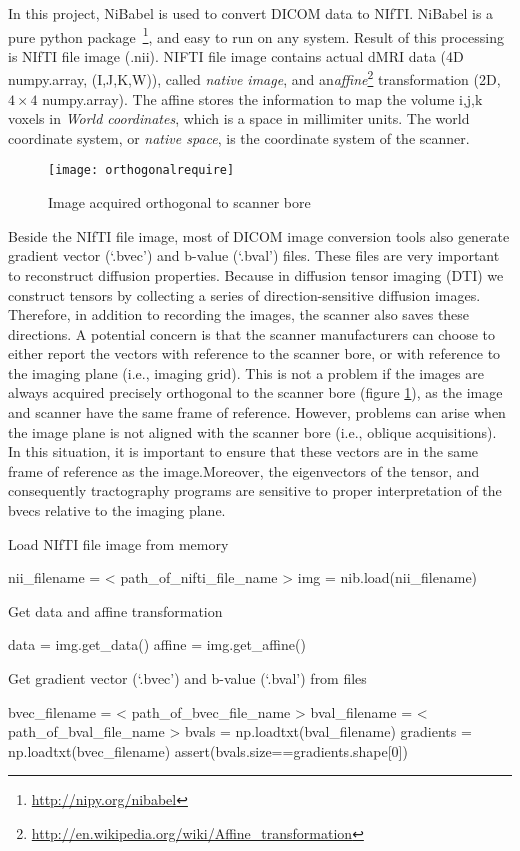 In this project, NiBabel is used to convert DICOM data to NIfTI. NiBabel is a pure python package~\footnote{\url{http://nipy.org/nibabel}}, and easy to run on any system. Result of this processing is NIfTI file image (.nii). NIFTI file image contains actual dMRI data (4D numpy.array, (I,J,K,W)), called \emph{native image}, and an\emph{affine}\footnote{\url{http://en.wikipedia.org/wiki/Affine_transformation}} transformation (2D, $4 \times 4$ numpy.array). The affine stores the information to map the volume i,j,k voxels in \emph{World coordinates}, which is a space in millimiter units. The world coordinate system, or \emph{native space}, is the coordinate system of the scanner.

\begin{figure} 
  \centering 
  \texttt{[image: orthogonalrequire]}
  \caption{Image acquired orthogonal to scanner bore}
  \label{Fig:orthogonal_require}
\end{figure}

Beside the NIfTI file image, most of DICOM image conversion tools also generate gradient vector (‘.bvec’) and b-value (‘.bval’) files. These files are very important to reconstruct diffusion properties. Because in diffusion tensor imaging (DTI) we construct tensors by collecting a series of direction-sensitive diffusion images. Therefore, in addition to recording the images, the scanner also saves these directions. A potential concern is that the scanner manufacturers can choose to either report the vectors with reference to the scanner bore, or with reference to the imaging plane (i.e., imaging grid). This is not a problem if the images are always acquired precisely orthogonal to the scanner bore (figure \ref{Fig:orthogonal_require}), as the image and scanner have the same frame of reference. However, problems can arise when the image plane is not aligned with the scanner bore (i.e., oblique acquisitions). In this situation, it is important to ensure that these vectors are in the same frame of reference as the image.Moreover, the eigenvectors of the tensor, and consequently tractography programs are sensitive to proper interpretation of the bvecs relative to the imaging plane.

Load NIfTI file image from memory
\begin{python}
nii_filename = < path_of_nifti_file_name >
img = nib.load(nii_filename)
\end{python}
Get data and affine transformation
\begin{python}
data = img.get_data()
affine = img.get_affine()
\end{python}
Get gradient vector (‘.bvec’) and b-value (‘.bval’) from files
\begin{python}
    bvec_filename = < path_of_bvec_file_name >
    bval_filename = < path_of_bval_file_name > 
    bvals = np.loadtxt(bval_filename)
    gradients = np.loadtxt(bvec_filename)
    assert(bvals.size==gradients.shape[0])
\end{python}

